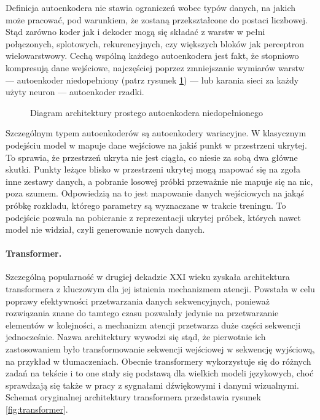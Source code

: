 Definicja autoenkodera nie stawia ograniczeń wobec typów danych, na jakich może pracować, pod warunkiem, że zostaną przekształcone do postaci liczbowej. Stąd zarówno koder jak i dekoder mogą się składać z warstw w pełni połączonych, splotowych, rekurencyjnych, czy większych bloków jak perceptron wielowarstwowy. Cechą wspólną każdego autoenkodera jest fakt, że stopniowo kompresują dane wejściowe, najczęściej poprzez zmniejszanie wymiarów warstw --- autoenkoder niedopełniony (patrz rysunek \ref{fig:autoenkoder}) --- lub karania sieci za każdy użyty neuron --- autoenkoder rzadki.

\begin{figure}[t]
	\centering
	
	\caption{Diagram architektury prostego autoenkodera niedopełnionego}
	\label{fig:autoenkoder}
\end{figure}

Szczególnym typem autoenkoderów są autoenkodery wariacyjne. W klasycznym podejściu model w mapuje dane wejściowe na jakiś punkt w przestrzeni ukrytej. To sprawia, że przestrzeń ukryta nie jest ciągła, co niesie za sobą dwa główne skutki. Punkty leżące blisko w przestrzeni ukrytej mogą mapować się na zgoła inne zestawy danych, a pobranie losowej próbki przeważnie nie mapuje się na nic, poza szumem. Odpowiedzią na to jest mapowanie danych wejściowych na jakąś próbkę rozkładu, którego parametry są wyznaczane w trakcie treningu. To podejście pozwala na pobieranie z reprezentacji ukrytej próbek, których nawet model nie widział, czyli generowanie nowych danych.

\paragraph{Transformer.}
Szczególną popularność w drugiej dekadzie XXI wieku zyskała architektura transformera z kluczowym dla jej istnienia mechanizmem atencji\cite{attentionisallyouneed2017}. Powstała w celu poprawy efektywności przetwarzania danych sekwencyjnych, ponieważ rozwiązania znane do tamtego czasu pozwalały jedynie na przetwarzanie elementów w kolejności, a mechanizm atencji przetwarza duże części sekwencji jednocześnie. Nazwa architektury wywodzi się stąd, że pierwotnie ich zastosowaniem było transformowanie sekwencji wejściowej w sekwencję wyjściową, na przykład w tłumaczeniach. Obecnie transformery wykorzystuje się do różnych zadań na tekście i to one stały się podstawą dla wielkich modeli językowych, choć sprawdzają się także w pracy z sygnałami dźwiękowymi i danymi wizualnymi. Schemat oryginalnej architektury transformera przedstawia rysunek \ref{fig:transformer}.

